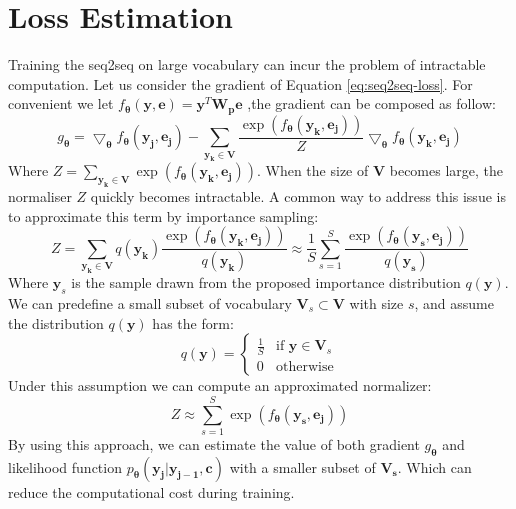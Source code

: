 \section{Loss Estimation}
Training the seq2seq on large vocabulary can incur the problem of intractable computation\cite{cho2015using}. Let us consider the gradient of Equation \ref{eq:seq2seq-loss}. For convenient we let $f_{\mathbf{\theta}}(\mathbf{y},\mathbf{e}) = \mathbf{y}^{T}\mathbf{W_{p}}\mathbf{e} $ ,the gradient can be composed as follow:
\begin{equation}\label{softmax_g}
g_{\mathbf{\theta}} = \bigtriangledown_{\mathbf{\theta}}f_{\mathbf{\theta}}(\mathbf{y_{j},e_{j}}) -\sum_{\mathbf{y_{k}\in V}} \frac{\exp(f_{\mathbf{\theta}}(\mathbf{y_{k},e_{j}}))}{Z}\bigtriangledown_{\mathbf{\theta}}f_{\mathbf{\theta}}(\mathbf{y_{k},\mathbf{e}_{j}})
\end{equation}
Where $Z = \sum_{\mathbf{y_{k}\in \mathbf{{V}}}}\exp(f_{\mathbf{\theta}}(\mathbf{y_{k},e_{j}}))$. 
When the size of $\mathbf{{V}}$ becomes large, the normaliser $Z$ quickly becomes intractable\cite{bengio2003quick}. 
A common way to address this issue is to approximate this term by importance sampling\cite{murphy2012machine}: 
\begin{equation}
Z = \sum_{\mathbf{y_{k}\in \mathbf{{V}}}}q(\mathbf{y_{k}})\frac{\exp(f_{\mathbf{\theta}}(\mathbf{y_{k},e_{j}}))}{q(\mathbf{y_{k}})} \approx \frac{1}{S}\sum_{s=1}^{S}\frac{\exp(f_{\mathbf{\theta}}(\mathbf{y_{s},e_{j}}))}{q(\mathbf{y_{s}})}
\end{equation}
Where $\mathbf{y}_{s}$ is the sample drawn from the proposed importance distribution $q(\mathbf{y})$. We can predefine a small subset of vocabulary $\mathbf{{V}}_{s} \subset \mathbf{{V}}$ with size $s$, and assume the distribution  $q(\mathbf{y})$ has the form\cite{bengio2008adaptive}:
\begin{equation}
q(\mathbf{y}) = \begin{cases}
\frac{1}{S} & \text{if } \mathbf{y} \in \mathbf{{V}}_{s} \\
0 & \text{otherwise}
\end{cases}
\end{equation}
Under this assumption we can compute an approximated normalizer:
\begin{equation}
Z \approx \sum_{s=1}^{S}\exp(f_{\mathbf{\theta}}(\mathbf{y_{s},e_{j}}))
\end{equation}
By using this approach, we can estimate the value of both gradient $g_{\mathbf{\theta}}$ and likelihood function $p_{\mathbf{\theta}}\mathbf{(y_{j}|y_{j-1},c)}$ with a smaller subset of $\mathbf{{V}_{s}}$.
Which can reduce the computational cost during training.
